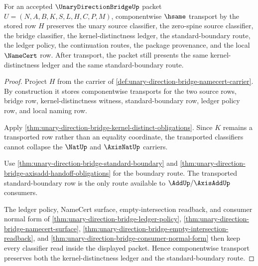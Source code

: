\begin{theorem}
\label{thm:unary-direction-bridge-classifier-stability}
For an accepted $\UnaryDirectionBridgeUp$ packet $U=(N,A,B,K,S,L,H,C,P,M)$, componentwise $\hsame$ transport by the stored row $H$ preserves the unary source classifier, the zero-spine source classifier, the bridge classifier, the kernel-distinctness ledger, the standard-boundary route, the ledger policy, the continuation routes, the package provenance, and the local $\NameCert$ row. After transport, the packet still presents the same kernel-distinctness ledger and the same standard-boundary route.
\end{theorem}
\begin{proof}
Project $H$ from the carrier of \autoref{def:unary-direction-bridge-namecert-carrier}. By construction it stores componentwise transports for the two source rows, bridge row, kernel-distinctness witness, standard-boundary row, ledger policy row, and local naming row.

Apply \autoref{thm:unary-direction-bridge-kernel-distinct-obligations}. Since $K$ remains a transported row rather than an equality coordinate, the transported classifiers cannot collapse the $\NatUp$ and $\AxisNatUp$ carriers.

Use \autoref{thm:unary-direction-bridge-standard-boundary} and \autoref{thm:unary-direction-bridge-axisadd-handoff-obligations} for the boundary route. The transported standard-boundary row is the only route available to $\AddUp/\AxisAddUp$ consumers.

The ledger policy, NameCert surface, empty-intersection readback, and consumer normal form of \autoref{thm:unary-direction-bridge-ledger-policy}, \autoref{thm:unary-direction-bridge-namecert-surface}, \autoref{thm:unary-direction-bridge-empty-intersection-readback}, and \autoref{thm:unary-direction-bridge-consumer-normal-form} then keep every classifier read inside the displayed packet. Hence componentwise transport preserves both the kernel-distinctness ledger and the standard-boundary route.
\end{proof}

